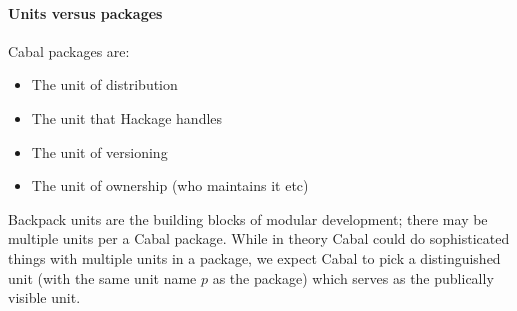 \documentclass{article}
\begin{document}
\paragraph{Units versus packages}

Cabal packages are:

\begin{itemize}
    \item The unit of distribution
    \item The unit that Hackage handles
    \item The unit of versioning
    \item The unit of ownership (who maintains it etc) 
\end{itemize}

Backpack units are the building blocks of modular development;
there may be multiple units per a Cabal package.  While in theory
Cabal could do sophisticated things with multiple units in a
package, we expect Cabal
to pick a distinguished unit (with the same unit name $p$ as
the package) which serves as the publically visible unit.


\end{document}
